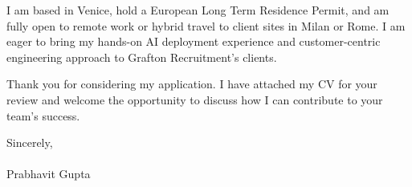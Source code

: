 \documentclass[11pt, a4paper]{article}
\begin{document}
\vspace{0.2cm}
\noindent I am based in Venice, hold a European Long Term Residence Permit, and am fully open to remote work or hybrid travel to client sites in Milan or Rome. I am eager to bring my hands-on AI deployment experience and customer-centric engineering approach to Grafton Recruitment's clients.

\vspace{0.2cm}
\noindent Thank you for considering my application. I have attached my CV for your review and welcome the opportunity to discuss how I can contribute to your team's success.

\vspace{0.5cm}
\noindent Sincerely, \\
\vspace{0.2cm} \\
Prabhavit Gupta
\end{document}
